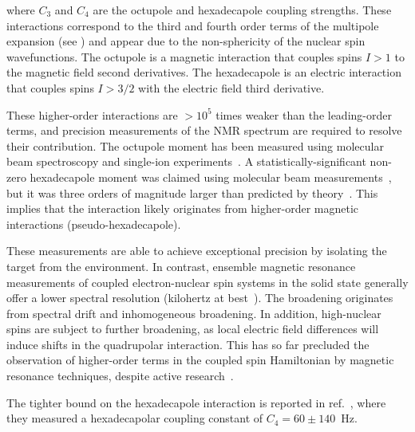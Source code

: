 where $C_3$ and $C_4$ are the octupole and hexadecapole coupling strengths. These interactions correspond to the third and fourth order terms of the multipole expansion (see ) and appear due to the non-sphericity of the nuclear spin wavefunctions. The octupole is a magnetic interaction that couples spins $I > 1$ to the magnetic field second derivatives. The hexadecapole is an electric interaction that couples spins $I > 3/2$ with the electric field third derivative.

These higher-order interactions are $>10^5$ times weaker than the leading-order terms, and precision measurements of the NMR spectrum are required to resolve their contribution. The octupole moment has been measured using molecular beam spectroscopy and single-ion experiments~. A statistically-significant non-zero hexadecapole moment was claimed using molecular beam measurements~, but it was three orders of magnitude larger than predicted by theory~. This implies that the interaction likely originates from higher-order magnetic interactions (pseudo-hexadecapole).

These measurements are able to achieve exceptional precision by isolating the target from the environment. In contrast, ensemble magnetic resonance measurements of coupled electron-nuclear spin systems in the solid state generally offer a lower spectral resolution (kilohertz at best~). The broadening originates from spectral drift and inhomogeneous broadening. In addition, high-nuclear spins are subject to further broadening, as local electric field differences will induce shifts in the quadrupolar interaction. This has so far precluded the observation of higher-order terms in the coupled spin Hamiltonian by magnetic resonance techniques, despite active research~.

The tighter bound on the hexadecapole interaction is reported in ref.~, where they measured a hexadecapolar coupling constant of $C_4=60\pm140$~Hz.


